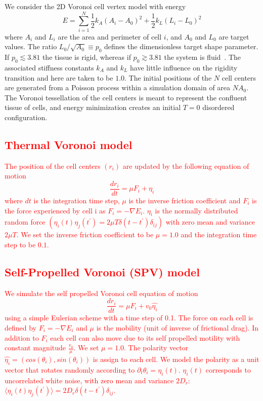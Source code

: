 \documentclass[twoside,twocolumn,9pt]{article}
\begin{document}
We consider the 2D Voronoi cell vertex model\cite{honda2004three,sussmanmerkelnounjam2018} with energy
\begin{equation}
\label{eq:arrhenius}
E = \sum^{N}_{i=1} \frac{1}{2}k_A (A_i - A_0)^2 + \frac{1}{2}k_L (L_i - L_0)^2
\end{equation}
where $A_i$ and $L_i$ are the area and perimeter of cell $i$, and $A_0$ and $L_0$ are target values.
The ratio $L_0/\sqrt{A_0} \equiv p_0$ defines the dimensionless target shape parameter.
 If $p_0 \lesssim 3.81$ the tissue is rigid, whereas if $p_0 \gtrsim 3.81$ the system is fluid~\cite{bi2015density}.
The associated stiffness constants $k_A$ and $k_L$ have little influence on the rigidity transition and here are taken to be $1.0$.
The initial positions of the $N$ cell centers are generated from a Poisson process within a simulation domain of area $N A_0$.
The Voronoi tessellation\cite{rycroft2009voro} of the cell centers is meant to represent the confluent tissue of cells, and energy minimization\cite{FIREminimizer} %
creates an initial $T=0$ disordered configuration.
\textcolor{red}{
\subsection{Thermal Voronoi model}
The position of the cell centers $(r_i)$ are updated by the following equation of motion 
\begin{equation}
    \frac{dr_i}{dt}=\mu F_i + \eta_{i}
\end{equation}
where $dt$ is the integration time step, $\mu$ is the inverse friction coefficient and $F_i$ is 
the force experienced by cell i as $F_i = -\nabla E_i$. $\eta_i$ is the normally distributed random force
$(\eta_i(t)\eta_j(t^\prime)=2\mu T \delta (t-t^\prime) \delta_{ij})$ with zero mean and variance $2\mu T$. We set the inverse friction coefficient to be $\mu = 1.0$ and the integration time step to be $0.1$.}

\textcolor{red}{
\subsection{Self-Propelled Voronoi (SPV) model}
We simulate the self propelled Voronoi cell equation of motion
\begin{equation}
    \frac{dr_i}{dt}=\mu F_i + v_0 \hat{\eta_{i}}
\end{equation}
using a simple Eulerian scheme with a time step of 0.1. The force on each cell is defined by $F_i=-\nabla E_i$ and $\mu$ is the mobility (unit of inverse of frictional drag). In addition to $F_i$ each cell can also move due to its self propelled motility with constant magnitude $\frac{v_0}{\mu}$. We set $\mu = 1.0$. The polarity vector $\hat{\eta_{i}}=(cos (\theta_i), sin (\theta_i))$ is assign to each cell. We model the polarity as a unit vector that rotates randomly according to $\partial_t\theta_i=\eta_i(t)$. $\eta_i(t)$ corresponds to uncorrelated white noise, with zero mean and variance $2D_r$: $\langle \eta_i(t)\eta_j(t^\prime)\rangle =2D_r\delta(t-t^\prime)\delta_{ij}$.
}
\end{document}
